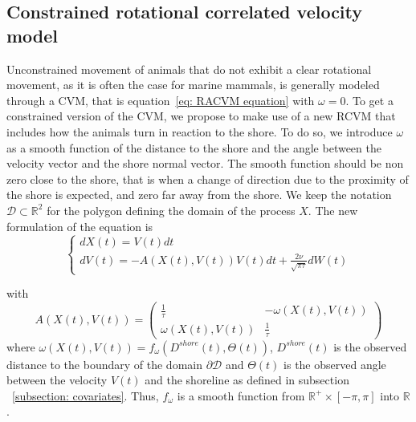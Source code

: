 \documentclass[11pt]{article}
\newcommand {\R}{\mathbb{R}}
\newcommand {\1}{\mathbb{1}}
\theoremstyle{definition}
\theoremstyle{remark}
\theoremstyle{remark}
\begin{document}
\subsection{Constrained rotational correlated velocity model}
\label{section: CRCVM}


Unconstrained movement of animals that do not exhibit a clear rotational movement, as it is often the case for marine mammals, is generally modeled through a CVM, that is equation~\ref{eq: RACVM equation} with $\omega=0$.
To get a constrained version of the CVM, we propose to make use of a new RCVM that includes how the animals turn in reaction to the shore. To do so, we introduce $\omega$ as a smooth function of the distance to the shore and the angle between the velocity vector and the shore normal vector. 
The smooth function should be non zero close to the shore, that is when a change of direction due to the proximity of the shore is expected, and  zero far away from the shore. 
We keep the notation $\mathcal{D} \subset \R^2$ for the polygon defining the domain of the process $X$. The new formulation of the equation is 
\begin{equation} \left\{
	\begin{array}{l}
		dX(t)=V(t) dt \\
		dV(t)=-A(X(t),V(t))V(t)dt+\frac{2\nu}{\sqrt{\pi \tau}} dW(t) 
		
	\end{array}
	\right.
	\label{eq: CRCVM equation}
\end{equation}

with 
\begin{equation} 
		A(X(t),V(t))=\begin{pmatrix} 
			\frac{1}{\tau} & -\omega(X(t),V(t)) \\
			\omega(X(t),V(t)) & \frac{1}{\tau}
		\end{pmatrix}
	\label{eq: CRCVM matrix A}
\end{equation}
where $\omega(X(t),V(t))=f_{\omega}(D^{shore}(t),\Theta(t))$, $D^{shore}(t)$ is the observed distance to the boundary of the domain $\partial \mathcal{D}$
and $\Theta(t)$ is the observed angle between the velocity $V(t)$ and the shoreline as defined in subsection ~\ref{subsection: covariates}. Thus, $f_{\omega}$ is a smooth function from $\R^{+} \times [-\pi,\pi]$ into $\R$.
\end{document}
